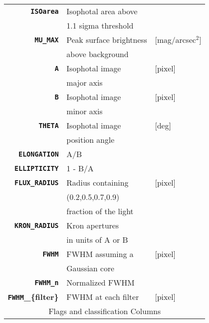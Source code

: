 \documentclass[fleqn,usenatbib]{mnras}
\begin{document}
\begin{table}
\begin{tabular}{rll}
\texttt{\textbf{ISOarea}}          & Isophotal area above    & \\ 
                                   & 1.1 sigma threshold     & \\
\texttt{\textbf{MU\_MAX}}          & Peak surface brightness & [mag/arcsec$^2$] \\
                                   & above background        & \\
\texttt{\textbf{A}}                & Isophotal image         & [pixel] \\
                                   & major axis              & \\
\texttt{\textbf{B}}                & Isophotal image         & [pixel] \\
                                   & minor axis              & \\
\texttt{\textbf{THETA}}            & Isophotal image         & [deg] \\
                                   & position angle          & \\
\texttt{\textbf{ELONGATION}}       & A/B                     & \\
\texttt{\textbf{ELLIPTICITY}}      & 1 - B/A                 & \\
\texttt{\textbf{FLUX\_RADIUS}}     & Radius containing       & [pixel] \\
                                   & (0.2,0.5,0.7,0.9)       & \\
                                   & fraction of the light   & \\
\texttt{\textbf{KRON\_RADIUS}}     & Kron apertures          & \\
                                   & in units of A or B      & \\
\texttt{\textbf{FWHM}}             & FWHM assuming a         & [pixel] \\
                                   & Gaussian core           & \\
\texttt{\textbf{FWHM\_n}}          & Normalized FWHM         & \\
\textbf{\texttt{FWHM}\_\{filter\}} & FWHM at each filter     & [pixel] \\
\hline \hline

\multicolumn{3}{c}{Flags and classification Columns} \\ \hline


\end{tabular}
\end{table}
\end{document}
